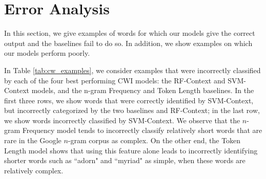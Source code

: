 \documentclass[thesis.tex]{subfiles}
\begin{document}
\section{Error Analysis}

In this section, we give examples of words for which our models give the correct output and the baselines fail to do so. In addition, we show examples on which our models perform poorly.

In Table \ref{tab:cw_examples}, we consider examples that were incorrectly classified by each of the four best performing CWI models: the RF-Context and SVM-Context models, and the n-gram Frequency and Token Length baselines. In the first three rows, we show words that were correctly identified by SVM-Context, but incorrectly categorized by the two baselines and RF-Context; in the last row, we show words incorrectly classified by SVM-Context. We observe that the $n$-gram Frequency model tends to incorrectly classify relatively short words that are rare in the Google $n$-gram corpus as complex. On the other end, the Token Length model shows that using this feature alone leads to incorrectly identifying shorter words such as ``adorn" and ``myriad" as simple, when these words are relatively complex.
\end{document}
